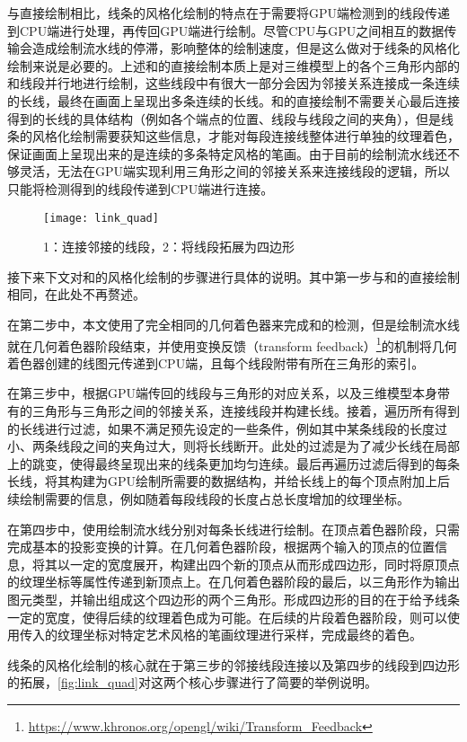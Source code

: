 与直接绘制相比，线条的风格化绘制的特点在于需要将GPU端检测到的线段传递到CPU端进行处理，再传回GPU端进行绘制。尽管CPU与GPU之间相互的数据传输会造成绘制流水线的停滞，影响整体的绘制速度，但是这么做对于线条的风格化绘制来说是必要的。上述\con{}和\scon{}的直接绘制本质上是对三维模型上的各个三角形内部的\con{}和\scon{}线段并行地进行绘制，这些线段中有很大一部分会因为邻接关系连接成一条连续的长线，最终在画面上呈现出多条连续的长线。\con{}和\scon{}的直接绘制不需要关心最后连接得到的长线的具体结构（例如各个端点的位置、线段与线段之间的夹角），但是线条的风格化绘制需要获知这些信息，才能对每段连接线整体进行单独的纹理着色，保证画面上呈现出来的是连续的多条特定风格的笔画。由于目前的绘制流水线还不够灵活，无法在GPU端实现利用三角形之间的邻接关系来连接线段的逻辑，所以只能将检测得到的线段传递到CPU端进行连接。

\begin{figure}[tbh]
    \centering
    \texttt{[image: link\_quad]}
    \caption[线条的风格化绘制]{\label{fig:link_quad}
    1：连接邻接的线段，2：将线段拓展为四边形}
\end{figure}

接下来下文对\con{}和\scon{}的风格化绘制的步骤进行具体的说明。其中第一步与\con{}和\scon{}的直接绘制相同，在此处不再赘述。

在第二步中，本文使用了完全相同的几何着色器来完成\con{}和\scon{}的检测，但是绘制流水线就在几何着色器阶段结束，并使用变换反馈（transform feedback）\footnote{\url{https://www.khronos.org/opengl/wiki/Transform_Feedback}}的机制将几何着色器创建的线图元传递到CPU端，且每个线段附带有所在三角形的索引。

在第三步中，根据GPU端传回的线段与三角形的对应关系，以及三维模型本身带有的三角形与三角形之间的邻接关系，连接线段并构建长线。接着，遍历所有得到的长线进行过滤，如果不满足预先设定的一些条件，例如其中某条线段的长度过小、两条线段之间的夹角过大，则将长线断开。此处的过滤是为了减少长线在局部上的跳变，使得最终呈现出来的线条更加均匀连续。最后再遍历过滤后得到的每条长线，将其构建为GPU绘制所需要的数据结构，并给长线上的每个顶点附加上后续绘制需要的信息，例如随着每段线段的长度占总长度增加的纹理坐标。

在第四步中，使用绘制流水线分别对每条长线进行绘制。在顶点着色器阶段，只需完成基本的投影变换的计算。在几何着色器阶段，根据两个输入的顶点的位置信息，将其以一定的宽度展开，构建出四个新的顶点从而形成四边形，同时将原顶点的纹理坐标等属性传递到新顶点上。在几何着色器阶段的最后，以三角形作为输出图元类型，并输出组成这个四边形的两个三角形。形成四边形的目的在于给予线条一定的宽度，使得后续的纹理着色成为可能。在后续的片段着色器阶段，则可以使用传入的纹理坐标对特定艺术风格的笔画纹理进行采样，完成最终的着色。

线条的风格化绘制的核心就在于第三步的邻接线段连接以及第四步的线段到四边形的拓展，\autoref{fig:link_quad}对这两个核心步骤进行了简要的举例说明。